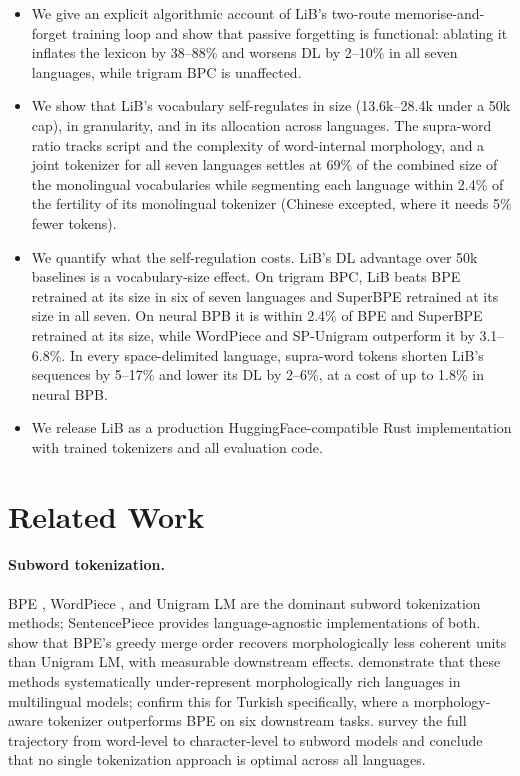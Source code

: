 \documentclass[pdflatex,sn-apa]{sn-jnl}
\begin{document}
\begin{itemize}
  \item We give an explicit algorithmic account of LiB's two-route
        memorise-and-forget training loop and show that passive forgetting is
        functional: ablating it inflates the lexicon by 38--88\% and worsens
        DL by 2--10\% in all seven languages, while trigram BPC is unaffected.
  \item We show that LiB's vocabulary self-regulates in size (13.6k--28.4k
        under a 50k cap), in granularity, and in its allocation across
        languages. The supra-word ratio tracks script and the complexity of
        word-internal morphology, and a joint tokenizer for all seven
        languages settles at 69\% of the combined size of the monolingual
        vocabularies while segmenting each language within 2.4\% of the
        fertility of its monolingual tokenizer (Chinese excepted, where it
        needs 5\% fewer tokens).
  \item We quantify what the self-regulation costs. LiB's DL advantage over
        50k baselines is a vocabulary-size effect. On trigram BPC, LiB beats
        BPE retrained at its size in six of seven languages and SuperBPE
        retrained at its size in all seven. On neural BPB it is within 2.4\%
        of BPE and SuperBPE retrained at its size, while WordPiece and
        SP-Unigram outperform it by 3.1--6.8\%. In every space-delimited
        language, supra-word tokens shorten LiB's sequences by 5--17\% and
        lower its DL by 2--6\%, at a cost of up to 1.8\% in neural BPB.
  \item We release LiB as a production HuggingFace-compatible Rust
        implementation with trained tokenizers and all evaluation code.
\end{itemize}


\section{Related Work}
\label{sec:related}

\paragraph{Subword tokenization.}
BPE \citep{sennrich-etal-2016-neural}, WordPiece \citep{schuster2012japanese},
and Unigram LM \citep{kudo-2018-subword} are the dominant subword tokenization
methods; SentencePiece \citep{kudo-richardson-2018-sentencepiece} provides
language-agnostic implementations of both.
\citet{bostrom2020bpe} show that BPE's greedy merge order recovers
morphologically less coherent units than Unigram LM, with measurable downstream
effects.
\citet{rust2021howgood} demonstrate that these methods systematically
under-represent morphologically rich languages in multilingual models;
\citet{toraman2023impact} confirm this for Turkish specifically, where a
morphology-aware tokenizer outperforms BPE on six downstream tasks.
\citet{mielke2021words} survey the full trajectory from word-level to
character-level to subword models and conclude that no single tokenization
approach is optimal across all languages.
\end{document}
